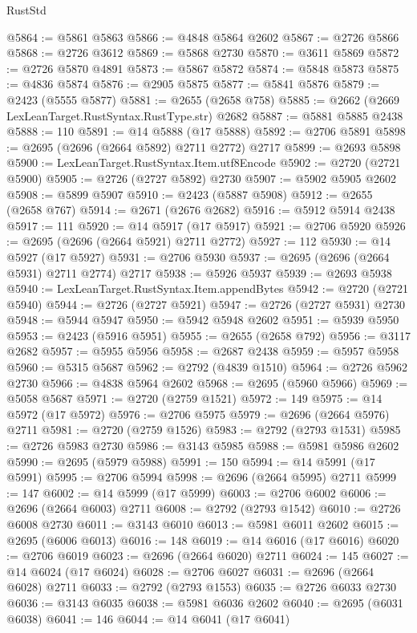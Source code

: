 \begin{lexlean}{RustStd}
\begin{coremodule}
@5864 := @5861 @5863
@5866 := @4848 @5864 @2602
@5867 := @2726 @5866
@5868 := @2726 @3612
@5869 := @5868 @2730
@5870 := @3611 @5869
@5872 := @2726 @5870 @4891
@5873 := @5867 @5872
@5874 := @5848 @5873
@5875 := @4836 @5874
@5876 := @2905 @5875
@5877 := @5841 @5876
@5879 := @2423 (@5555 @5877)
@5881 := @2655 (@2658 @758)
@5885 := @2662 (@2669 LexLeanTarget.RustSyntax.RustType.str) @2682
@5887 := @5881 @5885 @2438
@5888 := 110
@5891 := @14 @5888 (@17 @5888)
@5892 := @2706 @5891
@5898 := @2695 (@2696 (@2664 @5892) @2711 @2772) @2717
@5899 := @2693 @5898
@5900 := LexLeanTarget.RustSyntax.Item.utf8Encode
@5902 := @2720 (@2721 @5900)
@5905 := @2726 (@2727 @5892) @2730
@5907 := @5902 @5905 @2602
@5908 := @5899 @5907
@5910 := @2423 (@5887 @5908)
@5912 := @2655 (@2658 @767)
@5914 := @2671 (@2676 @2682)
@5916 := @5912 @5914 @2438
@5917 := 111
@5920 := @14 @5917 (@17 @5917)
@5921 := @2706 @5920
@5926 := @2695 (@2696 (@2664 @5921) @2711 @2772)
@5927 := 112
@5930 := @14 @5927 (@17 @5927)
@5931 := @2706 @5930
@5937 := @2695 (@2696 (@2664 @5931) @2711 @2774) @2717
@5938 := @5926 @5937
@5939 := @2693 @5938
@5940 := LexLeanTarget.RustSyntax.Item.appendBytes
@5942 := @2720 (@2721 @5940)
@5944 := @2726 (@2727 @5921)
@5947 := @2726 (@2727 @5931) @2730
@5948 := @5944 @5947
@5950 := @5942 @5948 @2602
@5951 := @5939 @5950
@5953 := @2423 (@5916 @5951)
@5955 := @2655 (@2658 @792)
@5956 := @3117 @2682
@5957 := @5955 @5956
@5958 := @2687 @2438
@5959 := @5957 @5958
@5960 := @5315 @5687
@5962 := @2792 (@4839 @1510)
@5964 := @2726 @5962 @2730
@5966 := @4838 @5964 @2602
@5968 := @2695 (@5960 @5966)
@5969 := @5058 @5687
@5971 := @2720 (@2759 @1521)
@5972 := 149
@5975 := @14 @5972 (@17 @5972)
@5976 := @2706 @5975
@5979 := @2696 (@2664 @5976) @2711
@5981 := @2720 (@2759 @1526)
@5983 := @2792 (@2793 @1531)
@5985 := @2726 @5983 @2730
@5986 := @3143 @5985
@5988 := @5981 @5986 @2602
@5990 := @2695 (@5979 @5988)
@5991 := 150
@5994 := @14 @5991 (@17 @5991)
@5995 := @2706 @5994
@5998 := @2696 (@2664 @5995) @2711
@5999 := 147
@6002 := @14 @5999 (@17 @5999)
@6003 := @2706 @6002
@6006 := @2696 (@2664 @6003) @2711
@6008 := @2792 (@2793 @1542)
@6010 := @2726 @6008 @2730
@6011 := @3143 @6010
@6013 := @5981 @6011 @2602
@6015 := @2695 (@6006 @6013)
@6016 := 148
@6019 := @14 @6016 (@17 @6016)
@6020 := @2706 @6019
@6023 := @2696 (@2664 @6020) @2711
@6024 := 145
@6027 := @14 @6024 (@17 @6024)
@6028 := @2706 @6027
@6031 := @2696 (@2664 @6028) @2711
@6033 := @2792 (@2793 @1553)
@6035 := @2726 @6033 @2730
@6036 := @3143 @6035
@6038 := @5981 @6036 @2602
@6040 := @2695 (@6031 @6038)
@6041 := 146
@6044 := @14 @6041 (@17 @6041)

\end{coremodule}
\end{lexlean}

